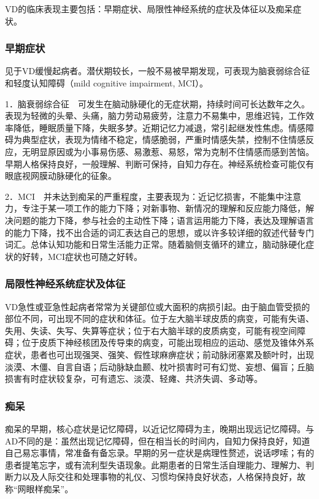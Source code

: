 VD的临床表现主要包括：早期症状、局限性神经系统的症状及体征以及痴呆症状。

\subsubsection{早期症状}

见于VD缓慢起病者。潜伏期较长，一般不易被早期发现，可表现为脑衰弱综合征和轻度认知障碍（mild
cognitive impairment, MCI）。

1．脑衰弱综合征　可发生在脑动脉硬化的无症状期，持续时间可长达数年之久。表现为轻微的头晕、头痛，脑力劳动易疲劳，注意力不易集中，思维迟钝，工作效率降低，睡眠质量下降，失眠多梦。近期记忆力减退，常引起继发性焦虑。情感障碍为典型症状，表现为情绪不稳定，情感脆弱，严重时情感失禁，控制不住情感反应，无明显原因或为小事易伤感、易激惹、易怒，常为克制不住情感而感到苦恼。早期人格保持良好，一般理解、判断可保持，自知力存在。神经系统检查可能仅有眼底视网膜动脉硬化的征象。

2．MCI　并未达到痴呆的严重程度，主要表现为：近记忆损害，不能集中注意力，专注于某一项工作的能力下降；对新事物、新情况的理解和反应能力降低，解决问题的能力下降，参与社会的主动性下降；语言运用能力下降，表达及理解语言的能力下降，找不出合适的词汇表达自己的思想，或以许多较详细的叙述代替专门词汇。总体认知功能和日常生活能力正常。随着脑侧支循环的建立，脑动脉硬化症状的好转，MCI症状也可随之好转。

\subsubsection{局限性神经系统症状及体征}

VD急性或亚急性起病者常常为关键部位或大面积的病损引起。由于脑血管受损的部位不同，可出现不同的症状和体征。位于左大脑半球皮质的病变，可能有失语、失用、失读、失写、失算等症状；位于右大脑半球的皮质病变，可能有视空间障碍；位于皮质下神经核团及传导束的病变，可能出现相应的运动、感觉及锥体外系症状，患者也可出现强哭、强笑、假性球麻痹症状；前动脉闭塞累及额叶时，出现淡漠、木僵、自言自语；后动脉缺血颞、枕叶损害时可有幻觉、妄想、偏盲；丘脑损害有时症状较复杂，可有遗忘、淡漠、轻瘫、共济失调、多动等。

\subsubsection{痴呆}

痴呆的早期，核心症状是记忆障碍，以近记忆障碍为主，晚期出现远记忆障碍。与AD不同的是：虽然出现记忆障碍，但在相当长的时间内，自知力保持良好，知道自己易忘事情，常准备有备忘录。早期的另一症状是病理性赘述，说话啰嗦；有的患者提笔忘字，或有流利型失语现象。此期患者的日常生活自理能力、理解力、判断力以及人际交往和处理事物的礼仪、习惯均保持良好状态，人格保持良好，故称``网眼样痴呆''。

